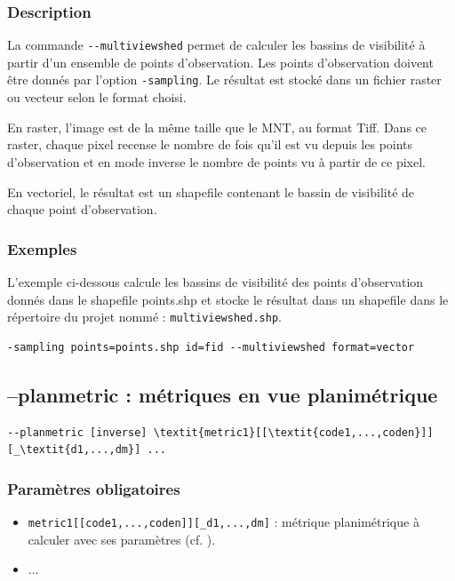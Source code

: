 \documentclass{report}
\begin{document}
\subsubsection{Description}
La commande \verb|--multiviewshed| permet de calculer les bassins de visibilité à partir d'un ensemble de points d'observation. Les points d'observation doivent être donnés par l'option \verb|-sampling|. Le résultat est stocké dans un fichier raster ou vecteur selon le format choisi. 

En raster, l'image est de la même taille que le MNT, au format Tiff. Dans ce raster, chaque pixel recense le nombre de fois qu'il est vu depuis les points d'observation et en mode inverse le nombre de points vu à partir de ce pixel.

En vectoriel, le résultat est un shapefile contenant le bassin de visibilité de chaque point d'observation.

\subsubsection{Exemples}
L'exemple ci-dessous calcule les bassins de visibilité des points d'observation donnés dans le shapefile points.shp et stocke le résultat dans un shapefile dans le répertoire du projet nommé : \verb|multiviewshed.shp|.
\begin{Verbatim}
-sampling points=points.shp id=fid --multiviewshed format=vector
\end{Verbatim}



\subsection{--planmetric : métriques en vue planimétrique}

\begin{Verbatim}[commandchars=\\\{\}]
--planmetric [inverse] \textit{metric1}[[\textit{code1,...,coden}]][_\textit{d1,...,dm}] ...
\end{Verbatim}

\subsubsection{Paramètres obligatoires}
\begin{itemize}
	\item \verb|metric1[[code1,...,coden]][_d1,...,dm]| : métrique planimétrique à calculer avec ses paramètres (cf. ).
	\item ...
\end{itemize}
\end{document}
